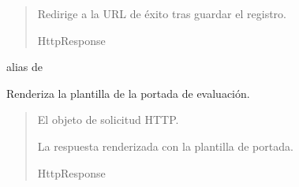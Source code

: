 \documentclass[letterpaper,10pt,spanish]{sphinxmanual}
\begin{document}
\begin{fulllineitems}
\begin{fulllineitems}
\begin{quote}
\begin{description}
\sphinxAtStartPar
Redirige a la URL de éxito tras guardar el registro.

\sphinxAtStartPar
HttpResponse

\end{description}\end{quote}

\end{fulllineitems}



\begin{fulllineitems}

\pysigstartsignatures
{}
\pysigstopsignatures
\sphinxAtStartPar
alias de 

\end{fulllineitems}



\begin{fulllineitems}

\pysigstartsignatures
{}
\pysigstopsignatures
\end{fulllineitems}



\begin{fulllineitems}

\pysigstartsignatures
{}
\pysigstopsignatures
\end{fulllineitems}


\end{fulllineitems}



\begin{fulllineitems}

\pysigstartsignatures
{}
\pysigstopsignatures
\sphinxAtStartPar
Renderiza la plantilla de la portada de evaluación.
\begin{quote}\begin{description}
\sphinxAtStartPar
{} \textendash{} El objeto de solicitud HTTP.

\sphinxAtStartPar
La respuesta renderizada con la plantilla de portada.

\sphinxAtStartPar
HttpResponse

\end{description}\end{quote}

\end{fulllineitems}
\end{document}
